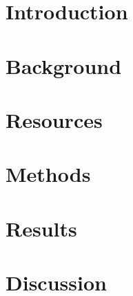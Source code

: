 \documentclass{bmcart}
\begin{document}


\section*{Introduction}


\section*{Background}


\section*{Resources}


\section*{Methods}


\section*{Results}


\section*{Discussion}

\end{document}
